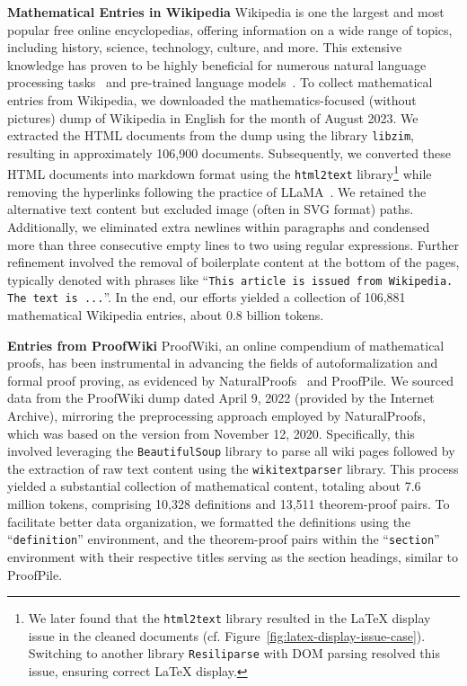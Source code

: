 \textbf{Mathematical Entries in Wikipedia} \quad Wikipedia is one the largest and most popular free online encyclopedias, offering information on a wide range of topics, including history, science, technology, culture, and more. This extensive knowledge has proven to be highly beneficial for numerous natural language processing tasks~\citep[][\emph{inter alia}]{DBLP:conf/nips/LewisPPPKGKLYR020-rag} and pre-trained language models~\citep[][\emph{inter alia}]{devlin-etal-2019-bert,DBLP:journals/corr/abs-2302-13971-llama}. To collect mathematical entries from Wikipedia, we downloaded the mathematics-focused (without pictures) dump of Wikipedia in English for the month of August 2023. We extracted the HTML documents from the dump using the library \texttt{libzim}, resulting in approximately 106,900 documents. Subsequently, we converted these HTML documents into markdown format using the  \texttt{html2text} library\footnote{We later found that the \texttt{html2text} library resulted in the LaTeX display issue in the cleaned documents (cf. Figure~\ref{fig:latex-display-issue-case}). Switching to another library \texttt{Resiliparse} with DOM parsing resolved this issue, ensuring correct LaTeX display.} while removing the hyperlinks following the practice of LLaMA~\citep{DBLP:journals/corr/abs-2302-13971-llama}. We retained the alternative text content but excluded image (often in SVG format) paths. Additionally, we eliminated extra newlines within paragraphs and condensed more than three consecutive empty lines to two using regular expressions. Further refinement involved the removal of boilerplate content at the bottom of the pages, typically denoted with phrases like ``\texttt{This article is issued from Wikipedia. The text is ...}''. In the end, our efforts yielded a collection of 106,881 mathematical Wikipedia entries, about 0.8 billion tokens.

\textbf{Entries from ProofWiki} \quad ProofWiki, an online compendium of mathematical proofs, has been instrumental in advancing the fields of autoformalization and formal proof proving, as evidenced by NaturalProofs~\citep{DBLP:conf/nips/Welleck0BHCCC21-naturalproofs} and ProofPile. We sourced data from the ProofWiki dump dated April 9, 2022 (provided by the Internet Archive), mirroring the preprocessing approach employed by NaturalProofs, which was based on the version from November 12, 2020. Specifically, this involved leveraging the \texttt{BeautifulSoup} library to parse all wiki pages followed by the extraction of raw text content using the \texttt{wikitextparser} library. This process yielded a substantial collection of mathematical content, totaling about 7.6 million tokens, comprising 10,328 definitions and 13,511 theorem-proof pairs. To facilitate better data organization, we formatted the definitions using the ``\texttt{definition}'' environment, and the theorem-proof pairs within the ``\texttt{section}'' environment with their respective titles serving as the section headings, similar to  ProofPile.

